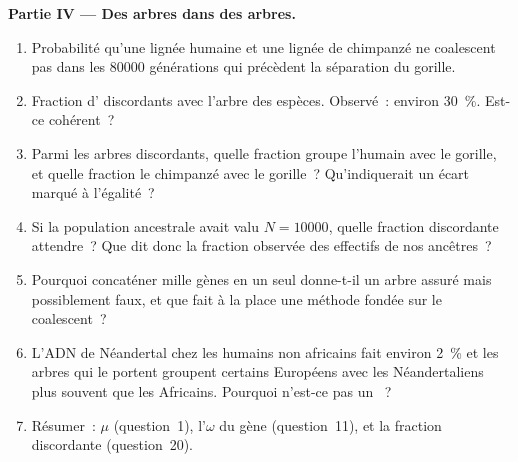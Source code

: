 \begin{problem}
\medskip
\noindent\textbf{Partie IV --- Des arbres dans des arbres.}
\begin{enumerate}[resume]
  \item Probabilité qu'une lignée humaine et une lignée de chimpanzé ne
        coalescent pas dans les \num{80000} générations qui précèdent la
        séparation du gorille.
  \item Fraction d' discordants avec l'arbre des espèces.
        Observé~: environ \qty{30}{\%}. Est-ce cohérent~?
  \item Parmi les arbres discordants, quelle fraction groupe l'humain
        avec le gorille, et quelle fraction le chimpanzé avec le
        gorille~? Qu'indiquerait un écart marqué à l'égalité~?
  \item Si la population ancestrale avait valu $N = \num{10000}$, quelle
        fraction discordante attendre~? Que dit donc la fraction
        observée des effectifs de nos ancêtres~?
  \item Pourquoi concaténer mille gènes en un seul  donne-t-il
        un arbre assuré mais possiblement faux, et que fait à la place
        une méthode fondée sur le coalescent~?
  \item L'ADN de Néandertal chez les humains non africains fait environ
        \qty{2}{\%} et les arbres qui le portent groupent certains
        Européens avec les Néandertaliens plus souvent que les
        Africains. Pourquoi n'est-ce pas un ~?
  \item Résumer~: $\mu$ (question~1), l'$\omega$ du gène (question~11),
        et la fraction discordante (question~20).
\end{enumerate}
\end{problem}
